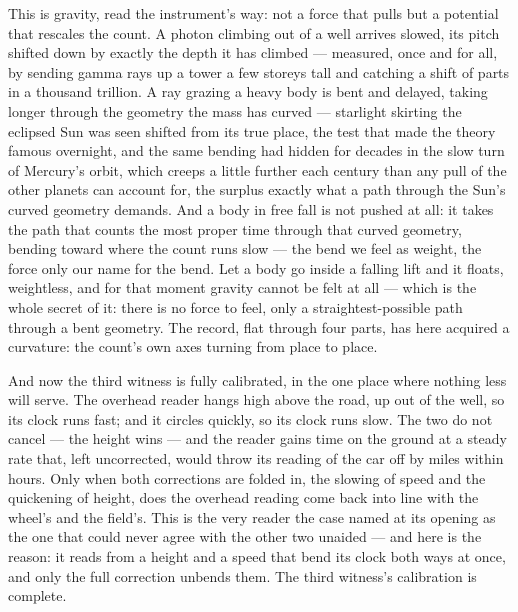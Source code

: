 This is gravity, read the instrument's way: not a force that pulls but a potential that rescales the count. A
photon climbing out of a well arrives slowed, its pitch shifted down by exactly the depth it has climbed ---
measured, once and for all, by sending gamma rays up a tower a few storeys tall and catching a shift of parts in
a thousand trillion. A ray grazing a heavy body is bent and delayed, taking longer through the geometry the mass
has curved --- starlight skirting the eclipsed Sun was seen shifted from its true place, the test that made the
theory famous overnight, and the same bending had hidden for decades in the slow turn of Mercury's orbit, which
creeps a little further each century than any pull of the other planets can account for, the surplus exactly
what a path through the Sun's curved geometry demands. And a body in free fall is not pushed at all: it takes
the path that counts the most proper time through that curved geometry, bending toward where the count runs slow
--- the bend we feel as weight, the force only our name for the bend. Let a body go inside a falling lift and it
floats, weightless, and for that moment gravity cannot be felt at all --- which is the whole secret of it: there
is no force to feel, only a straightest-possible path through a bent geometry. The record, flat through four parts, has here acquired a curvature: the count's own
axes turning from place to place.

And now the third witness is fully calibrated, in the one place where nothing less will serve. The overhead
reader hangs high above the road, up out of the well, so its clock runs fast; and it circles quickly, so its
clock runs slow. The two do not cancel --- the height wins --- and the reader gains time on the ground at a
steady rate that, left uncorrected, would throw its reading of the car off by miles within hours. Only when both
corrections are folded in, the slowing of speed and the quickening of height, does the overhead reading come
back into line with the wheel's and the field's. This is the very reader the case named at its opening as the
one that could never agree with the other two unaided --- and here is the reason: it reads from a height and a
speed that bend its clock both ways at once, and only the full correction unbends them. The third witness's
calibration is complete.

